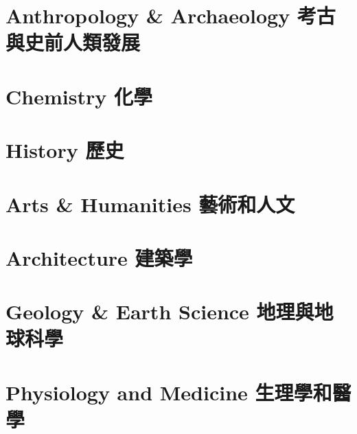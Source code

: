 \documentclass[twoside,b5paper]{book}
\begin{document}
  \chapter{Anthropology \& Archaeology 考古與史前人類發展}

  \chapter{Chemistry 化學}

  \chapter{History 歷史}

  \chapter{Arts \& Humanities 藝術和人文}

  \chapter{Architecture 建築學}

  \chapter{Geology \& Earth Science 地理與地球科學}

  \chapter{Physiology and Medicine 生理學和醫學}
\end{document}
